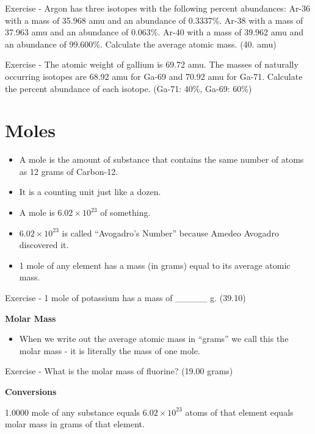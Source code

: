 \documentclass[../hchem.tex]{subfiles}
\begin{document}
Exercise - Argon has three isotopes with the following percent abundances: Ar-36 with a mass of 
35.968 amu and an abundance of 0.3337\%. Ar-38 with a mass of 37.963 amu and an abundance of 0.063\%.
Ar-40 with a mass of 39.962 amu and an abundance of 99.600\%. Calculate the average atomic mass. (40. amu)

Exercise - The atomic weight of gallium is 69.72 amu. The masses of naturally occurring isotopes are 68.92 amu for Ga-69 
and 70.92 amu for Ga-71. Calculate the percent abundance of each isotope. (Ga-71: 40\%, Ga-69: 60\%)
\section{Moles}
\begin{itemize}
    \item A mole is the amount of substance that contains the same number of atoms as 12 grams of Carbon-12.
    \item It is a counting unit just like a dozen.
    \item A mole is $6.02\times 10^{23}$ of something.
\end{itemize}

\begin{itemize}
    \item $6.02\times10^{23}$ is called ``Avogadro's Number'' because Amedeo Avogadro discovered it.
    \item 1 mole of any element has a mass (in grams) equal to its average atomic mass.
\end{itemize}

Exercise - 1 mole of potassium has a mass of \_\_\_\_\_ g. (39.10)

\textbf{Molar Mass}
\begin{itemize}
    \item When we write out the average atomic mass in ``grams'' we call this the molar mass - it is literally the mass of one mole.
\end{itemize}

Exercise - What is the molar mass of fluorine? (19.00 grams)

\textbf{Conversions}

1.0000 mole of any substance equals $6.02\times10^{23}$ atoms of that element equals molar mass in grams of that element.
\end{document}

